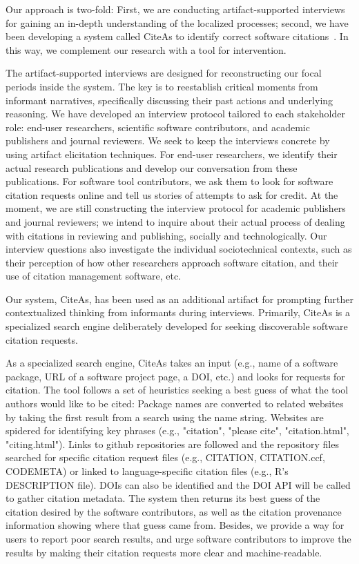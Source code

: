 \documentclass[sigchi-a,screen]{acmart}
\begin{document}
Our approach is two-fold: First, we are conducting artifact-supported interviews for gaining an in-depth understanding of the localized processes; second, we have been developing a system called CiteAs to identify correct software citations~\cite{priem01cite}. In this way, we complement our research with a tool for intervention.

The artifact-supported interviews are designed for reconstructing our focal periods inside the system. The key is to reestablish critical moments from informant narratives, specifically discussing their past actions and underlying reasoning. We have developed an interview protocol tailored to each stakeholder role: end-user researchers, scientific software contributors, and academic publishers and journal reviewers. We seek to keep the interviews concrete by using artifact elicitation techniques. For end-user researchers, we identify their actual research publications and develop our conversation from these publications. For software tool contributors, we ask them to look for software citation requests online and tell us stories of attempts to ask for credit. At the moment, we are still constructing the interview protocol for academic publishers and journal reviewers; we intend to inquire about their actual process of dealing with citations in reviewing and publishing, socially and technologically. Our interview questions also investigate the individual sociotechnical contexts, such as their perception of how other researchers approach software citation, and their use of citation management software, etc.

Our system, CiteAs, has been used as an additional artifact for prompting further contextualized thinking from informants during interviews. Primarily, CiteAs is a specialized search engine deliberately developed for seeking discoverable software citation requests. 

As a specialized search engine, CiteAs takes an input (e.g., name of a software package, URL of a software project page, a DOI, etc.) and looks for requests for citation. The tool follows a set of heuristics seeking a best guess of what the tool authors would like to be cited: Package names are converted to related websites by taking the first result from a search using the name string. Websites are spidered for identifying key phrases (e.g., "citation", "please cite", "citation.html", "citing.html"). Links to github repositories are followed and the repository files searched for specific citation request files (e.g., CITATION, CITATION.ccf, CODEMETA) or linked to language-specific citation files (e.g., R's DESCRIPTION file). DOIs can also be identified and the DOI API will be called to gather citation metadata. The system then returns its best guess of the citation desired by the software contributors, as well as the citation provenance information showing where that guess came from. Besides, we provide a way for users to report poor search results, and urge software contributors to improve the results by making their citation requests more clear and machine-readable.
\end{document}
